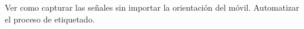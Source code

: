 \begin{recomendations}
	Ver como capturar las señales sin importar la orientación del móvil.
	Automatizar el proceso de etiquetado. 
\end{recomendations}
